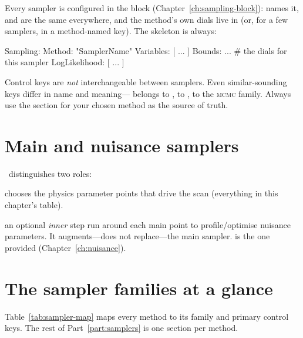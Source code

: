 Every sampler is configured in the  block (Chapter~\ref{ch:sampling-block}):
 names it,  and  are the same
everywhere, and the method's own dials live in  (or, for a few samplers, in a
method-named key). The skeleton is always:

\begin{yamlwin}
Sampling:
  Method: "SamplerName"
  Variables: [ ... ]
  Bounds: { ... }        # the dials for this sampler
  LogLikelihood: [ ... ]
\end{yamlwin}

\begin{jwarn}
Control keys are \emph{not} interchangeable between samplers. Even similar-sounding keys differ
in name and meaning--- belongs to ,
 to ,  to the \textsc{mcmc} family. Always
use the section for your chosen method as the source of truth.
\end{jwarn}

\section{Main and nuisance samplers}
\label{sec:choose-main-nuisance}

\Jarvis\ distinguishes two roles:

\begin{description}[style=nextline, leftmargin=1.2em]
  \item[Main sampler] chooses the physics parameter points that drive the scan (everything in
        this chapter's table).
  \item[Nuisance sampler] an optional \emph{inner} step run around each main point to
        profile/optimise nuisance parameters. It augments---does not replace---the main sampler.
         is the one provided (Chapter~\ref{ch:nuisance}).
\end{description}

\section{The sampler families at a glance}
\label{sec:choose-families}

Table~\ref{tab:sampler-map} maps every method to its family and primary control keys. The rest of
Part~\ref{part:samplers} is one section per method.

